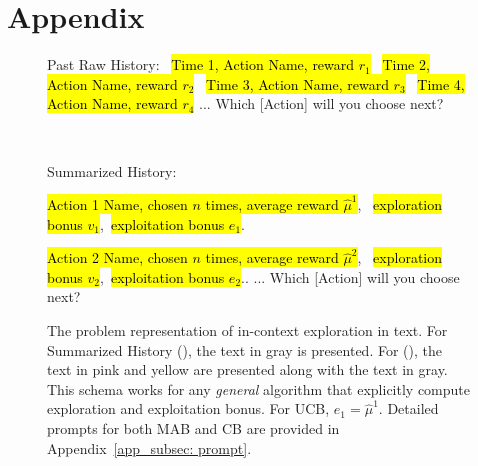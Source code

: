 \newpage
\section{Appendix}

\begin{figure}[h]
\noindent
\small
    \centering
  \begin{minipage}[t]{0.42\textwidth}
    \begin{tcolorbox} \newline
        [Instructions]  \newline 
        Past Raw History: \newline
        ~\hl{Time 1, Action Name, reward $r_1$} \newline 
        ~\hl{Time 2, Action Name, reward $r_2$} \newline
        ~\hl{Time 3, Action Name, reward $r_3$} \newline
        ~\hl{Time 4, Action Name, reward $r_4$} \newline
        ... \newline 
        Which [Action] will you choose next? 
    \end{tcolorbox}
\end{minipage}%
~
\begin{minipage}[t]{0.56\textwidth}
\small
    \begin{tcolorbox} \newline
  [Instructions]  \newline 
    Summarized History: \newline
    \parbox{\linewidth}{\hl{Action 1 Name, chosen $n$ times, average reward $\hat \mu^{1}$},~\hl{ exploration bonus $v_1$},~\hl{exploitation bonus $e_1$}.} \newline 
     \hl{Action 2 Name, chosen $n$ times, average reward $\hat \mu^{2}$},~\hl{ exploration bonus $v_2$},~\hl{exploitation bonus $e_2$}.. \newline
    ... \newline 
    Which [Action] will you choose next? 
    \end{tcolorbox}
\end{minipage}%
    \caption{\footnotesize{The problem representation of in-context exploration in text. For Summarized History (\SH), the text in gray is presented. For \ag (\AG), the text in pink and yellow are presented along with the text in gray. This schema works for any \textit{general} algorithm that explicitly compute exploration and exploitation bonus. For UCB, $e_1 = \hat\mu^1$. Detailed prompts for both MAB and CB are provided in Appendix~\ref{app_subsec: prompt}.}}
    \label{fig:prompt}
\end{figure}

